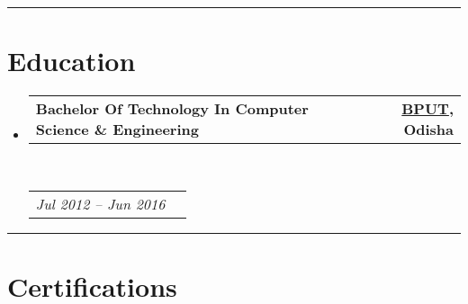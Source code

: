\documentclass[10pt,a4paper,hidelinks]{article}
\makeatletter
\newcommand{\headerrow}[2]
{\begin{tabular*}{\linewidth}{l@{\extracolsep{\fill}}r}
	#1 &
	#2 \\
\end{tabular*}}
\makeatother
\begin{document}



{\color{IFLightBlue} \hrule}
\vspace{-0.3em}
{\color{IFMediumBlue}\section*{Education}}

\begin{itemize}
	\parskip=0.1em

	\item 
	\headerrow
		{\textbf{Bachelor Of Technology In Computer Science \& Engineering}}
		{\textbf{\colorbox{IFLightBlue!10}{\href{http://www.bput.ac.in}{{BPUT}}}{, Odisha}}}
	\\
	\headerrow
		{\emph{Jul 2012 -- Jun 2016}}
		{\emph{}}

\end{itemize}


{\color{IFLightBlue} \hrule}
\vspace{-0.3em}
{\color{IFMediumBlue}\section*{Certifications}}
\end{document}
